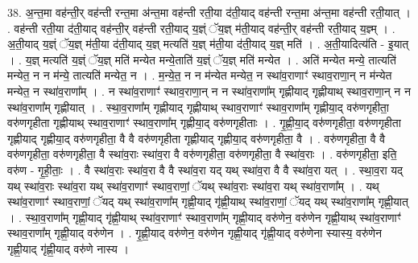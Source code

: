 \documentclass[17pt]{extarticle}
\begin{document}
38. अ॒न्त॒मा वह॑न्ती॒र् वह॑न्ती रन्त॒मा अ॑न्त॒मा वह॑न्ती रती॒या द॑ती॒याद् वह॑न्ती रन्त॒मा अ॑न्त॒मा वह॑न्ती रती॒यात् । . वह॑न्ती रती॒या द॑ती॒याद् वह॑न्ती॒र् वह॑न्ती रती॒याद् य॒ज्ञ्ं ॅय॒ज्ञ् म॑ती॒याद् वह॑न्ती॒र् वह॑न्ती रती॒याद् य॒ज्ञ्म् । . अ॒ती॒याद् य॒ज्ञ्ं ॅय॒ज्ञ् म॑ती॒या द॑ती॒याद् य॒ज्ञ् मत्यति॑ य॒ज्ञ् म॑ती॒या द॑ती॒याद् य॒ज्ञ् मति॑ । . अ॒ती॒यादित्य॑ति - इ॒यात् । . य॒ज्ञ् मत्यति॑ य॒ज्ञ्ं ॅय॒ज्ञ् मति॑ मन्येत मन्ये॒ताति॑ य॒ज्ञ्ं ॅय॒ज्ञ् मति॑ मन्येत । . अति॑ मन्येत मन्ये॒ तात्यति॑ मन्येत॒ न न म॑न्ये॒ तात्यति॑ मन्येत॒ न । . म॒न्ये॒त॒ न न म॑न्येत मन्येत॒ न स्था॑व॒राणाꣳ॑ स्थाव॒राणा॒न् न म॑न्येत मन्येत॒ न स्था॑व॒राणा᳚म् । . न स्था॑व॒राणाꣳ॑ स्थाव॒राणा॒न् न न स्था॑व॒राणा᳚म् गृह्णीयाद् गृह्णीयाथ् स्थाव॒राणा॒न् न न स्था॑व॒राणा᳚म् गृह्णीयात् । . स्था॒व॒राणा᳚म् गृह्णीयाद् गृह्णीयाथ् स्थाव॒राणाꣳ॑ स्थाव॒राणा᳚म् गृह्णीया॒द् वरु॑णगृहीता॒ वरु॑णगृहीता गृह्णीयाथ् स्थाव॒राणाꣳ॑ स्थाव॒राणा᳚म् गृह्णीया॒द् वरु॑णगृहीताः । . गृ॒ह्णी॒या॒द् वरु॑णगृहीता॒ वरु॑णगृहीता गृह्णीयाद् गृह्णीया॒द् वरु॑णगृहीता॒ वै वै वरु॑णगृहीता गृह्णीयाद् गृह्णीया॒द् वरु॑णगृहीता॒ वै । . वरु॑णगृहीता॒ वै वै वरु॑णगृहीता॒ वरु॑णगृहीता॒ वै स्था॑व॒राः स्था॑व॒रा वै वरु॑णगृहीता॒ वरु॑णगृहीता॒ वै स्था॑व॒राः । . वरु॑णगृहीता॒ इति॒ वरु॑ण - गृ॒ही॒ताः॒ । . वै स्था॑व॒राः स्था॑व॒रा वै वै स्था॑व॒रा यद् यथ् स्था॑व॒रा वै वै स्था॑व॒रा यत् । . स्था॒व॒रा यद् यथ् स्था॑व॒राः स्था॑व॒रा यथ् स्था॑व॒राणाꣳ॑ स्थाव॒राणां॒ ॅयथ् स्था॑व॒राः स्था॑व॒रा यथ् स्था॑व॒राणा᳚म् । . यथ् स्था॑व॒राणाꣳ॑ स्थाव॒राणां॒ ॅयद् यथ् स्था॑व॒राणा᳚म् गृह्णी॒याद् गृ॑ह्णी॒याथ् स्था॑व॒राणां॒ ॅयद् यथ् स्था॑व॒राणा᳚म् गृह्णी॒यात् । . स्था॒व॒राणा᳚म् गृह्णी॒याद् गृ॑ह्णी॒याथ् स्था॑व॒राणाꣳ॑ स्थाव॒राणा᳚म् गृह्णी॒याद् वरु॑णेन॒ वरु॑णेन गृह्णी॒याथ् स्था॑व॒राणाꣳ॑ स्थाव॒राणा᳚म् गृह्णी॒याद् वरु॑णेन । . गृ॒ह्णी॒याद् वरु॑णेन॒ वरु॑णेन गृह्णी॒याद् गृ॑ह्णी॒याद् वरु॑णेना स्यास्य॒ वरु॑णेन गृह्णी॒याद् गृ॑ह्णी॒याद् वरु॑णे नास्य । \newline
\pagebreak
{}
\end{document}
